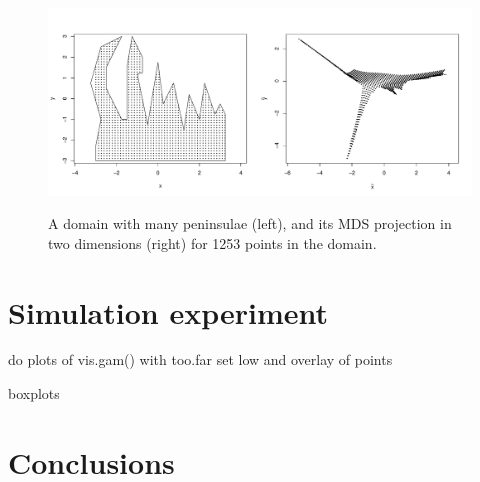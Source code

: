 \documentclass[a4paper,10pt]{amsart}
\begin{document}
\begin{figure}
\centering
\includegraphics[width=6in]{figs/wt2-mds.pdf}\\
\caption{A domain with many peninsulae (left), and its MDS projection in two dimensions (right) for 1253 points in the domain.}
\label{wt2dia}
\end{figure}












\section{Simulation experiment}







do plots of vis.gam() with too.far set low and overlay of points

boxplots



\section{Conclusions}




\end{document}
